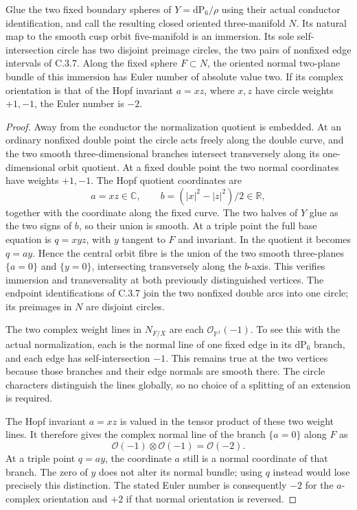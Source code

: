 \begin{proposition}
Glue the two fixed boundary spheres of \(Y=\mathrm{dP}_6/\rho\)
using their actual conductor identification, and call the resulting
closed oriented three-manifold \(N\). Its natural map to the
smooth cusp orbit five-manifold is an immersion. Its sole
self-intersection circle has two disjoint preimage circles, the
two pairs of nonfixed edge intervals of C.3.7.
Along the fixed sphere \(F\subset N\), the oriented normal
two-plane bundle of this immersion has Euler number of absolute
value two. If its complex orientation is that of the Hopf invariant
\(a=xz\), where \(x,z\) have circle weights \(+1,-1\), the
Euler number is \(-2\).
\end{proposition}
\begin{proof}
Away from the conductor the normalization quotient is embedded.
At an ordinary nonfixed double point the circle acts freely along
the double curve, and the two smooth three-dimensional branches
intersect transversely along its one-dimensional orbit quotient.
At a fixed double point the two normal coordinates have weights
\(+1,-1\). The Hopf quotient coordinates are
\[
 a=xz\in\mathbb C,\qquad
 b=(|x|^2-|z|^2)/2\in\mathbb R,
\]
together with the coordinate along the fixed curve. The two
halves of \(Y\) glue as the two signs of \(b\), so their
union is smooth. At a triple point the full base equation is
\(q=xyz\), with \(y\) tangent to \(F\) and invariant.
In the quotient it becomes \(q=ay\). Hence the central orbit
fibre is the union of the two smooth three-planes
\(\{a=0\}\) and \(\{y=0\}\), intersecting transversely
along the \(b\)-axis. This verifies immersion and transversality
at both previously distinguished vertices. The endpoint
identifications of C.3.7 join the two nonfixed double arcs into
one circle; its preimages in \(N\) are disjoint circles.

The two complex weight lines in \(N_{F/X}\) are each
\(\mathcal O_{\mathbb P^1}(-1)\). To see this with the actual
normalization, each is the normal line of one fixed edge in its
\(\mathrm{dP}_6\) branch, and each edge has self-intersection
\(-1\). This remains true at the two vertices because those
branches and their edge normals are smooth there. The circle
characters distinguish the lines globally, so no choice of a
splitting of an extension is required.

The Hopf invariant \(a=xz\) is valued in the tensor product
of these two weight lines. It therefore gives the complex normal
line of the branch \(\{a=0\}\) along \(F\) as
\[
 \mathcal O(-1)\otimes\mathcal O(-1)=\mathcal O(-2).
\]
At a triple point \(q=ay\), the coordinate \(a\) still is
a normal coordinate of that branch. The zero of \(y\) does
not alter its normal bundle; using \(q\) instead would lose
precisely this distinction. The stated Euler number is consequently
\(-2\) for the \(a\)-complex orientation and \(+2\) if that
normal orientation is reversed.


\end{proof}
